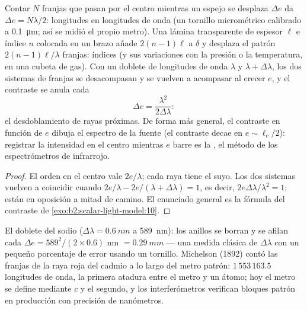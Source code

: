\begin{proposition}\label{prop:b2:michelson:measure}
Contar $N$ franjas que pasan por el centro mientras un espejo se desplaza $\Delta e$
da $\Delta e = N\lambda/2$: longitudes en longitudes de onda (un tornillo micrométrico
calibrado a \qty{0.1}{\micro m}; así se midió el propio metro). Una
lámina transparente de espesor $\ell$ e índice $n$ colocada en un brazo
añade $2(n - 1)\ell$ a $\delta$ y desplaza el patrón $2(n - 1)\ell/\lambda$
franjas: índices (y sus variaciones con la presión o la temperatura,
en una cubeta de gas). Con un doblete de longitudes de onda $\lambda$ y $\lambda + \Delta\lambda$, los
dos sistemas de franjas se desacompasan y se vuelven a acompasar al crecer $e$, y el
contraste se anula cada
\[
\Delta e = \frac{\lambda^2}{2\Delta\lambda} :
\]
el desdoblamiento de rayas próximas. De forma más general, el contraste en
función de $e$ dibuja el espectro de la fuente (el contraste
decae en $e \sim \ell_c/2$): registrar la intensidad en el centro mientras
$e$ barre es la \emph{}, el método de
los espectrómetros de infrarrojo.
\end{proposition}

\begin{proof}
El orden en el centro vale $2e/\lambda$; cada raya tiene el suyo. Los dos
sistemas vuelven a coincidir cuando $2e/\lambda - 2e/(\lambda + \Delta\lambda) = 1$, es decir, $2e\Delta\lambda
/\lambda^2 = 1$; están en oposición a mitad de camino. El enunciado general es
la fórmula del contraste de \cref{exo:b2:scalar-light-model:10}.
\end{proof}

\begin{example}\label{ex:b2:michelson:sodium}
El doblete del sodio ($\Delta\lambda = \qty{0.6}{nm}$ a \qty{589}{nm}): los anillos se borran y
se afilan cada $\Delta e = 589^2/(2 \times 0.6)$ nm $= \qty{0.29}{mm}$ --- una medida clásica
de $\Delta\lambda$ con un pequeño porcentaje de error usando un tornillo. Michelson (1892)
contó las franjas de la raya roja del cadmio a lo largo del metro
patrón: $1\,553\,163.5$ longitudes de onda, la primera atadura entre el
metro y un átomo; hoy el metro se define mediante $c$ y el
segundo, y los interferómetros verifican bloques patrón en producción con precisión de
nanómetros.
\end{example}

